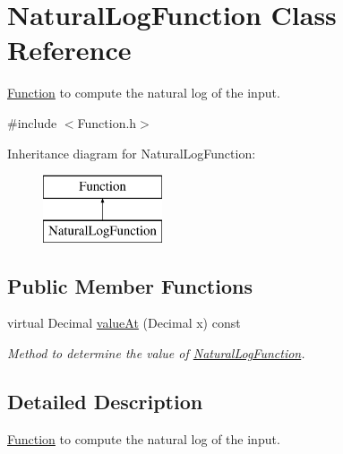 \hypertarget{class_natural_log_function}{\section{Natural\+Log\+Function Class Reference}
\label{class_natural_log_function}
}


\hyperlink{class_function}{Function} to compute the natural log of the input.  




{\ttfamily \#include $<$Function.\+h$>$}

Inheritance diagram for Natural\+Log\+Function\+:\begin{figure}[H]
\begin{center}
\leavevmode
\includegraphics[height=2.000000cm]{class_natural_log_function}
\end{center}
\end{figure}
\subsection*{Public Member Functions}
\begin{DoxyCompactItemize}
\item 
virtual Decimal \hyperlink{class_natural_log_function_af9192cb43f0d62106525dafbdef0b414}{value\+At} (Decimal x) const 
\begin{DoxyCompactList}\small\item\em Method to determine the value of \hyperlink{class_natural_log_function}{Natural\+Log\+Function}. \end{DoxyCompactList}\end{DoxyCompactItemize}


\subsection{Detailed Description}
\hyperlink{class_function}{Function} to compute the natural log of the input. 

